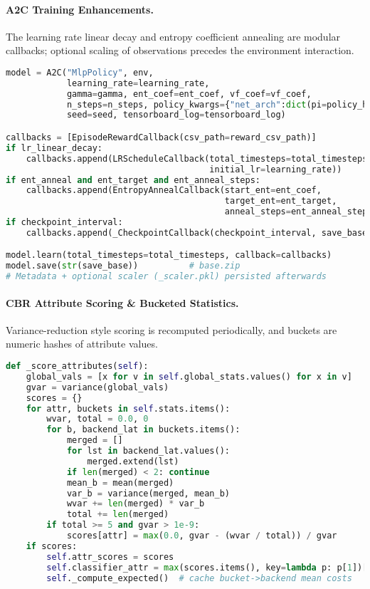 \paragraph{A2C Training Enhancements.}
The learning rate linear decay and entropy coefficient annealing are modular callbacks; optional scaling of observations precedes the environment interaction.
\begin{lstlisting}[language=Python,
    caption={Adaptive Q-Learning training fragment},
    label={lst:qtrain},
    breaklines=true,
    breakatwhitespace=true
]
model = A2C("MlpPolicy", env,
            learning_rate=learning_rate,
            gamma=gamma, ent_coef=ent_coef, vf_coef=vf_coef,
            n_steps=n_steps, policy_kwargs={"net_arch":dict(pi=policy_hidden, vf=policy_hidden)},
            seed=seed, tensorboard_log=tensorboard_log)

callbacks = [EpisodeRewardCallback(csv_path=reward_csv_path)]
if lr_linear_decay:
    callbacks.append(LRScheduleCallback(total_timesteps=total_timesteps,
                                        initial_lr=learning_rate))
if ent_anneal and ent_target and ent_anneal_steps:
    callbacks.append(EntropyAnnealCallback(start_ent=ent_coef,
                                           target_ent=ent_target,
                                           anneal_steps=ent_anneal_steps))
if checkpoint_interval:
    callbacks.append(_CheckpointCallback(checkpoint_interval, save_base))

model.learn(total_timesteps=total_timesteps, callback=callbacks)
model.save(str(save_base))          # base.zip
# Metadata + optional scaler (_scaler.pkl) persisted afterwards
\end{lstlisting}

\paragraph{CBR Attribute Scoring \& Bucketed Statistics.}
Variance-reduction style scoring is recomputed periodically, and buckets are numeric hashes of attribute values.
\begin{lstlisting}[language=Python,caption={CBR attribute scoring loop},label={lst:cbr-score}]
def _score_attributes(self):
    global_vals = [x for v in self.global_stats.values() for x in v]
    gvar = variance(global_vals)
    scores = {}
    for attr, buckets in self.stats.items():
        wvar, total = 0.0, 0
        for b, backend_lat in buckets.items():
            merged = []
            for lst in backend_lat.values():
                merged.extend(lst)
            if len(merged) < 2: continue
            mean_b = mean(merged)
            var_b = variance(merged, mean_b)
            wvar += len(merged) * var_b
            total += len(merged)
        if total >= 5 and gvar > 1e-9:
            scores[attr] = max(0.0, gvar - (wvar / total)) / gvar
    if scores:
        self.attr_scores = scores
        self.classifier_attr = max(scores.items(), key=lambda p: p[1])[0]
        self._compute_expected()  # cache bucket->backend mean costs
\end{lstlisting}

